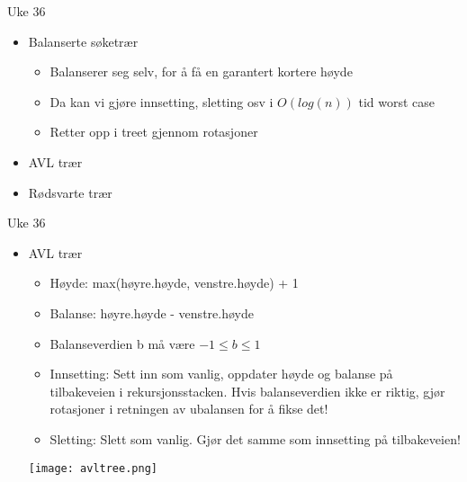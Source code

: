 \documentclass[norsk]{beamer}
\begin{document}
	\begin{frame}{Uke 36}
		\begin{itemize}
			\item Balanserte søketrær
				\begin{itemize}
					\item Balanserer seg selv, for å få en garantert kortere høyde
					\item Da kan vi gjøre innsetting, sletting osv i $O(log(n))$ tid worst
						case
					\item Retter opp i treet gjennom rotasjoner
				\end{itemize}
			\item AVL trær
			\item Rødsvarte trær
		\end{itemize}
	\end{frame}
	\begin{frame}{Uke 36}
		\begin{itemize}
			\item AVL trær
			\begin{itemize}
				\item Høyde: max(høyre.høyde, venstre.høyde) + 1
				\item Balanse: høyre.høyde - venstre.høyde
				\item Balanseverdien b må være $-1 \leq b \leq 1$
				\item Innsetting: Sett inn som vanlig, oppdater høyde og balanse på
					tilbakeveien i rekursjonsstacken. Hvis balanseverdien ikke er
					riktig, gjør rotasjoner i retningen av ubalansen for å fikse det!
				\item Sletting: Slett som vanlig. Gjør det samme som innsetting på
					tilbakeveien!
			\end{itemize}

			\begin{center}
				\texttt{[image: avltree.png]}
			\end{center}
		\end{itemize}
	\end{frame}
\end{document}
